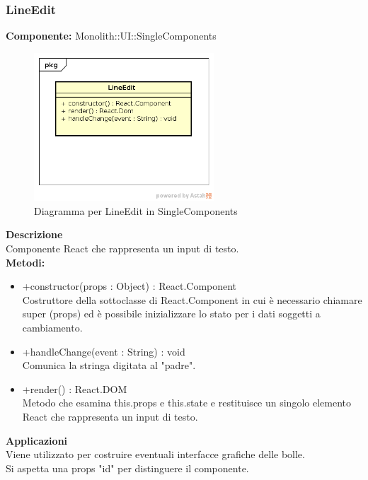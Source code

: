 \clearpage

\subsubsection{LineEdit}
\textbf{Componente:}  Monolith::UI::SingleComponents\\
   \FloatBarrier
   \begin{figure}[ht]
   \centering
   \includegraphics[width=0.6\textwidth]{img/single-LineEdit.png}
   \caption{{Diagramma per LineEdit in SingleComponents}}
\end{figure}
\FloatBarrier
\textbf{Descrizione}\\
Componente React che rappresenta un input di testo. \\
\textbf{Metodi:} 
\begin{itemize}
\item +constructor(props : Object) : React.Component 
\\
Costruttore della sottoclasse di React.Component in cui è necessario chiamare super (props) ed è possibile inizializzare lo stato per i dati soggetti a cambiamento.
\item +handleChange(event : String) : void  
\\
Comunica la stringa digitata al "padre". 
\item +render() : React.DOM 
\\
Metodo che esamina this.props e this.state e restituisce un singolo elemento React che rappresenta un input di testo.
\end{itemize} 


\textbf{Applicazioni}\\
Viene utilizzato per costruire eventuali interfacce grafiche delle bolle. \\
Si aspetta una props "id" per distinguere il componente. 


\clearpage

